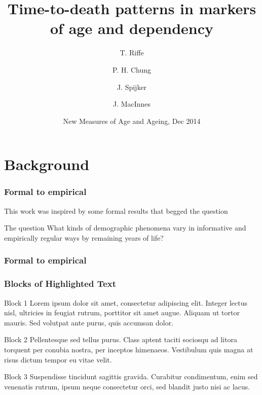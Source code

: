 \documentclass{beamer}
\title[TTD markers]{Time-to-death patterns in markers of age and dependency}
\author[Riffe et. al.]
{
T. Riffe \inst{1} \and P. H. Chung \inst{1} \and J. Spijker \inst{2} \and J.
MacInnes \inst{3} }
\institute[VFU] %
{
  \inst{1}%
  Department of Demography\\
  University of California, Berkeley
  \and
  \inst{2}%
  Vienna Institute of Demography
  \and
  \inst{3}
  School of Social and Political Science\\
  University of Edinburgh
}
\date[Dec 2014] %
{New Measures of Age and Ageing, Dec 2014}
\begin{document}
\begin{frame}
\titlepage %
\end{frame}

\section{Background} %

\begin{frame}
\frametitle{Formal to empirical}
This work was inspired by some formal results that begged the question
\begin{block}{The question}
What kinds of demographic phenomena vary in informative and empirically regular
ways by remaining years of life?
\end{block}
\end{frame}


\begin{frame}
\frametitle{Formal to empirical}

\end{frame}


\begin{frame}
\frametitle{Blocks of Highlighted Text}
\begin{block}{Block 1}
Lorem ipsum dolor sit amet, consectetur adipiscing elit. Integer lectus nisl, ultricies in feugiat rutrum, porttitor sit amet augue. Aliquam ut tortor mauris. Sed volutpat ante purus, quis accumsan dolor.
\end{block}

\begin{block}{Block 2}
Pellentesque sed tellus purus. Class aptent taciti sociosqu ad litora torquent per conubia nostra, per inceptos himenaeos. Vestibulum quis magna at risus dictum tempor eu vitae velit.
\end{block}

\begin{block}{Block 3}
Suspendisse tincidunt sagittis gravida. Curabitur condimentum, enim sed venenatis rutrum, ipsum neque consectetur orci, sed blandit justo nisi ac lacus.
\end{block}
\end{frame}

\end{document}

